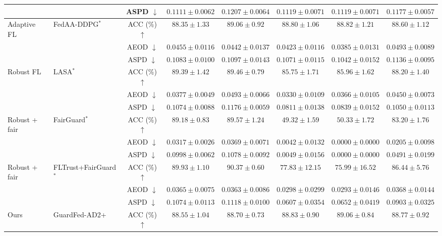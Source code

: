 \begin{table}[t]
{\begin{tabular}{l|l|c|ccccc}
 &  & ASPD $\downarrow$ & $0.1111 \pm 0.0062$ & $0.1207 \pm 0.0064$ & $0.1119 \pm 0.0071$ & $0.1119 \pm 0.0071$ & $0.1177 \pm 0.0057$ \\
\hline
\multirow{3}{*}{Adaptive FL} & \multirow{3}{*}{FedAA-DDPG$^{*}$} & ACC (\%) $\uparrow$ & $88.35 \pm 1.33$ & $89.06 \pm 0.92$ & $88.80 \pm 1.06$ & $88.82 \pm 1.21$ & $88.60 \pm 1.12$ \\
 &  & AEOD $\downarrow$ & $0.0455 \pm 0.0116$ & $0.0442 \pm 0.0137$ & $0.0423 \pm 0.0116$ & $0.0385 \pm 0.0131$ & $0.0493 \pm 0.0089$ \\
 &  & ASPD $\downarrow$ & $0.1083 \pm 0.0100$ & $0.1097 \pm 0.0143$ & $0.1071 \pm 0.0115$ & $0.1042 \pm 0.0152$ & $0.1136 \pm 0.0095$ \\
\hline
\multirow{3}{*}{Robust FL} & \multirow{3}{*}{LASA$^{*}$} & ACC (\%) $\uparrow$ & $89.39 \pm 1.42$ & $89.46 \pm 0.79$ & $85.75 \pm 1.71$ & $85.96 \pm 1.62$ & $88.20 \pm 1.40$ \\
 &  & AEOD $\downarrow$ & $0.0377 \pm 0.0049$ & $0.0493 \pm 0.0066$ & $0.0330 \pm 0.0109$ & $0.0366 \pm 0.0105$ & $0.0450 \pm 0.0073$ \\
 &  & ASPD $\downarrow$ & $0.1074 \pm 0.0088$ & $0.1176 \pm 0.0059$ & $0.0811 \pm 0.0138$ & $0.0839 \pm 0.0152$ & $0.1050 \pm 0.0113$ \\
\hline
\multirow{3}{*}{Robust + fair} & \multirow{3}{*}{FairGuard$^{*}$} & ACC (\%) $\uparrow$ & $89.18 \pm 0.83$ & $89.57 \pm 1.24$ & $49.32 \pm 1.59$ & $50.33 \pm 1.72$ & $83.20 \pm 1.76$ \\
 &  & AEOD $\downarrow$ & $0.0317 \pm 0.0026$ & $0.0369 \pm 0.0071$ & $0.0042 \pm 0.0132$ & $0.0000 \pm 0.0000$ & $0.0205 \pm 0.0098$ \\
 &  & ASPD $\downarrow$ & $0.0998 \pm 0.0062$ & $0.1078 \pm 0.0092$ & $0.0049 \pm 0.0156$ & $0.0000 \pm 0.0000$ & $0.0491 \pm 0.0199$ \\
\hline
\multirow{3}{*}{Robust + fair} & \multirow{3}{*}{FLTrust+FairGuard$^{*}$} & ACC (\%) $\uparrow$ & $89.93 \pm 1.10$ & $90.37 \pm 0.60$ & $77.83 \pm 12.15$ & $75.99 \pm 16.52$ & $86.44 \pm 5.76$ \\
 &  & AEOD $\downarrow$ & $0.0365 \pm 0.0075$ & $0.0363 \pm 0.0086$ & $0.0298 \pm 0.0299$ & $0.0293 \pm 0.0146$ & $0.0368 \pm 0.0144$ \\
 &  & ASPD $\downarrow$ & $0.1074 \pm 0.0113$ & $0.1118 \pm 0.0100$ & $0.0607 \pm 0.0354$ & $0.0652 \pm 0.0419$ & $0.0903 \pm 0.0325$ \\
\hline
\multirow{3}{*}{Ours} & \multirow{3}{*}{GuardFed-AD2+} & ACC (\%) $\uparrow$ & $88.55 \pm 1.04$ & $88.70 \pm 0.73$ & $88.83 \pm 0.90$ & $89.06 \pm 0.84$ & $88.77 \pm 0.92$ \\

\end{tabular}}
\end{table}
